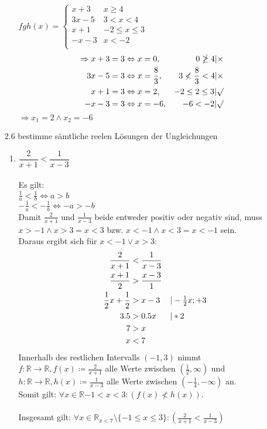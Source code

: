 \documentclass[12pt,letterpaper]{article}
\newcommand{\alignleft}[1]{\tag*{\llap{\makebox[\linewidth][l]{$#1$}}}}
\newcommand{\LLeftrightarrow}{ \alignleft{\Leftrightarrow}}
\newcommand{\eqinfo}[1]{&\makebox[2cm][l]{$\vert #1$}}
\newcommand{\Eqn}[3]{#1 &#2 #3}
\newcommand{\geqnf}[3]{\Eqn{#1}{#2}{#3}\\}
\newcommand{\geqn}[3]{\LLeftrightarrow\Eqn{#1}{#2}{#3}\\}
\newcommand{\geqni}[4]{\LLeftrightarrow\Eqn{#1}{#2}{#3}\eqinfo{#4}\\}
\begin{document}
\begin{enumerate}
\begin{enumerate}
$fgh(x) = \begin{cases}
x+3 &x\geq 4\\
3x-5 &3<x<4\\
x+1 &-2\leq x\leq 3\\
-x-3 &x<-2\\
\end{cases}$\\
\begin{align*}
\Rightarrow x+3&=3 \Leftrightarrow x=0, &0\ngeq 4|\times\\
3x-5&=3 \Leftrightarrow x=\frac{8}{3}, &3\nless\frac{8}{3}< 4|\times\\
x+1&=3 \Leftrightarrow x=2, &-2\leq 2\leq 3|\surd\\
-x-3&=3 \Leftrightarrow x=-6, &-6<-2|\surd\\
\end{align*}
$\Rightarrow x_1 = 2 \land x_2 = -6$
\end{enumerate}
\item [2.6] bestimme sämtliche reelen Lösungen der Ungleichungen
\begin{enumerate}
\item $\dfrac{2}{x+1}<\dfrac{1}{x-3}$\\\\
Es gilt:\\
$\frac{1}{a}<\frac{1}{b}\Leftrightarrow a>b$\\
$-\frac{1}{a}<-\frac{1}{b}\Leftrightarrow -a>-b$\\
Damit $\frac{2}{x+1}$ und $\frac{1}{x-3}$ beide entweder positiv oder negativ sind, muss $x>-1 \land x>3 = x<3$ bzw. $x<-1 \land x<3 = x<-1$ sein.\\
Daraus ergibt sich für $x<-1 \lor x>3$:
\begin{align*}
\geqnf{\frac{2}{x+1}}{<}{\frac{1}{x-3}}
\geqn{\frac{x+1}{2}}{>}{\frac{x-3}{1}}
\geqni{\frac{1}{2}x+\frac{1}{2}}{>}{x-3}{-\frac{1}{2}x; +3}
\geqni{3.5}{>}{0.5x}{*2}
\geqn{7}{>}{x}
\geqn{x}{<}{7}
\end{align*}
Innerhalb des restlichen Intervalls $(-1,3)$ nimmt $f:\mathbb{R}\to\mathbb{R}, f(x)\coloneqq\frac{2}{x+1}$ alle Werte zwischen $(\frac{1}{2},\infty)$ und $h:\mathbb{R}\to\mathbb{R}, h(x)\coloneqq\frac{1}{x-3}$ alle Werte zwischen $(-\frac{1}{4}, -\infty)$ an.\\
Somit gilt: $\forall x\in\mathbb{R}{-1<x<3}:(f(x)\nless h(x))$.\\\\
Insgesamt gilt: $\forall x\in\mathbb{R}_{x<7}\setminus\{-1\leq x\leq3\}:(\frac{2}{x+1}<\frac{1}{x-3})$


\end{enumerate}
\end{enumerate}
\end{document}
